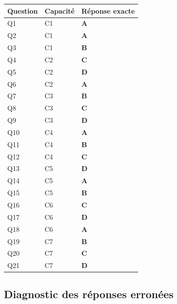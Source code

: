 \begin{center}
\begin{tabular}{lll}
\hline
Question & Capacité & Réponse exacte \\
\hline
Q1 & C1 & \textbf{A} \\
Q2 & C1 & \textbf{A} \\
Q3 & C1 & \textbf{B} \\
Q4 & C2 & \textbf{C} \\
Q5 & C2 & \textbf{D} \\
Q6 & C2 & \textbf{A} \\
Q7 & C3 & \textbf{B} \\
Q8 & C3 & \textbf{C} \\
Q9 & C3 & \textbf{D} \\
Q10 & C4 & \textbf{A} \\
Q11 & C4 & \textbf{B} \\
Q12 & C4 & \textbf{C} \\
Q13 & C5 & \textbf{D} \\
Q14 & C5 & \textbf{A} \\
Q15 & C5 & \textbf{B} \\
Q16 & C6 & \textbf{C} \\
Q17 & C6 & \textbf{D} \\
Q18 & C6 & \textbf{A} \\
Q19 & C7 & \textbf{B} \\
Q20 & C7 & \textbf{C} \\
Q21 & C7 & \textbf{D} \\
\hline
\end{tabular}
\end{center}

\subsection*{Diagnostic des réponses erronées}

